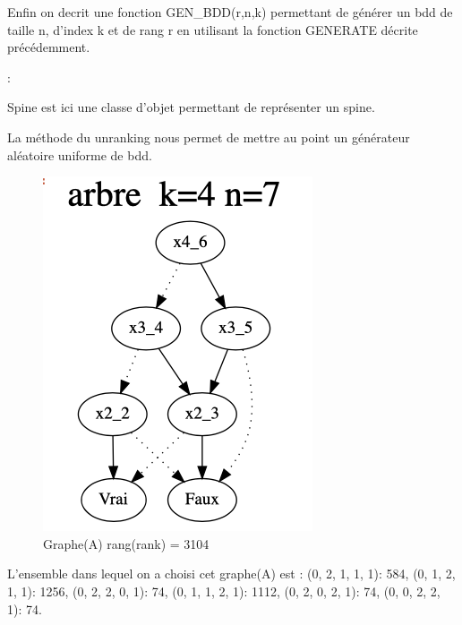 \documentclass[french]{article}
\begin{document}
\newpage

Enfin on decrit une fonction GEN\_BDD(r,n,k) permettant de générer un bdd de taille n, d'index k et de rang r en utilisant la fonction GENERATE décrite précédemment.

\begin{algorithm}
  \begin{algorithmic}[1]
    \Statex
            \State {}
            \State {}
            \State {}
            \State {}
            \State {}
                \State {}
                :
                    \State {}
                    \State {}
                    \State {}
            \EndFor
  \end{algorithmic}
\end{algorithm}

Spine est ici une classe d'objet permettant de représenter un spine.

La méthode du unranking nous permet de mettre au point un générateur aléatoire uniforme de bdd.

\begin{figure}[h!]
    \centering
    \includegraphics[scale=0.4]{arb_3104.png}
    \caption{Graphe(A) rang(rank) = 3104}
    \label{fig:graphe_A}
\end{figure}
L'ensemble dans lequel on a choisi cet graphe(A) est : {(0, 2, 1, 1, 1): 584, (0, 1, 2, 1, 1): 1256, (0, 2, 2, 0, 1): 74, (0, 1, 1, 2, 1): 1112, (0, 2, 0, 2, 1): 74, (0, 0, 2, 2, 1): 74}.
\end{document}
